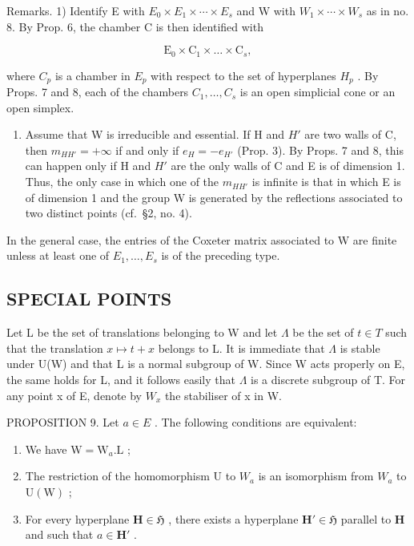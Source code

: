 Remarks. 1) Identify E with \(E_{0} \times E_{1} \times \cdots \times E_{s}\) and W with \(W_{1} \times \cdots \times W_{s}\) as in no. 8. By Prop. 6, the chamber C is then identified with

\[
\mathrm{E} _ {0} \times \mathrm{C} _ {1} \times \dots \times \mathrm{C} _ {s},
\]

where \(C_{p}\) is a chamber in \(E_{p}\) with respect to the set of hyperplanes \(H_{p}\) . By Props. 7 and 8, each of the chambers \(C_{1},\ldots,C_{s}\) is an open simplicial cone or an open simplex.

\begin{enumerate}
\def\labelenumi{\arabic{enumi})}
\setcounter{enumi}{1}
\tightlist
\item
  Assume that W is irreducible and essential. If H and \(H'\) are two walls of C, then \(m_{HH'} = +\infty\) if and only if \(e_{H} = -e_{H'}\) (Prop. 3). By Props. 7 and 8, this can happen only if H and \(H'\) are the only walls of C and E is of dimension 1. Thus, the only case in which one of the \(m_{HH'}\) is infinite is that in which E is of dimension 1 and the group W is generated by the reflections associated to two distinct points (cf.~§2, no. 4).
\end{enumerate}

In the general case, the entries of the Coxeter matrix associated to W are finite unless at least one of \(E_{1},\ldots,E_{s}\) is of the preceding type.

\subsection{SPECIAL POINTS}

Let L be the set of translations belonging to W and let \(\Lambda\) be the set of \(t \in T\) such that the translation \(x \mapsto t + x\) belongs to L. It is immediate that \(\Lambda\) is stable under U(W) and that L is a normal subgroup of W. Since W acts properly on E, the same holds for L, and it follows easily that \(\Lambda\) is a discrete subgroup of T. For any point x of E, denote by \(W_x\) the stabiliser of x in W.

PROPOSITION 9. Let \(a \in E\) . The following conditions are equivalent:

\begin{enumerate}
\def\labelenumi{(\roman{enumi})}
\item
  We have \(\mathrm{W} = \mathrm{W}_{a}.\mathrm{L}\) ;
\item
  The restriction of the homomorphism U to \(W_{a}\) is an isomorphism from \(W_{a}\) to \(\mathrm{U}(\mathrm{W})\) ;
\item
  For every hyperplane \(\mathbf{H} \in \mathfrak{H}\) , there exists a hyperplane \(\mathbf{H}' \in \mathfrak{H}\) parallel to \(\mathbf{H}\) and such that \(a \in \mathbf{H}'\) .
\end{enumerate}

